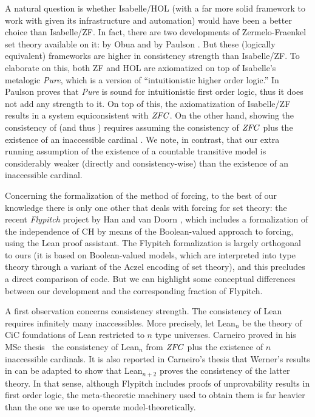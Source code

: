 A natural question is whether Isabelle/HOL (with a far more solid
framework to work with given its infrastructure and automation) would
have been a better choice than Isabelle/ZF. In fact,
there are two developments of Zermelo-Fraenkel set theory available on
it:  by Obua \cite{DBLP:conf/ictac/Obua06} and
 by Paulson
\cite{ZFC_in_HOL-AFP}. But these (logically equivalent) frameworks are
higher in consistency strength than Isabelle/ZF. To elaborate on this,
both ZF and HOL are axiomatized on top of Isabelle's metalogic
\emph{Pure}, which is a version of ``intuitionistic higher order
logic.'' In  \cite{Paulson1989} Paulson proves that \emph{Pure}
is sound for intuitionistic first order logic, thus it does not add
any strength to it. On top of this, the axiomatization of Isabelle/ZF
results in a system equiconsistent with $\mathit{ZFC}$. On the other hand,
showing the consistency of  (and thus
) requires
assuming the consistency of $\mathit{ZFC}$ plus the existence of an
inaccessible cardinal \cite[Sect.~3]{DBLP:conf/ictac/Obua06}. We note,
in contrast, that our extra running assumption of the existence of a
countable transitive model is considerably weaker (directly and
consistency-wise) than the existence of an inaccessible cardinal.

Concerning the formalization of the method of forcing, to the best of
our knowledge there is only one other that deals with forcing for
set theory: the recent \emph{Flypitch} project by Han and van Doorn
\cite{han_et_al:LIPIcs:2019:11074,DBLP:conf/cpp/HanD20}, which
includes a formalization of the independence of CH by means of the
Boolean-valued approach to forcing, using the Lean proof
assistant. The Flypitch formalization is largely orthogonal to ours
(it is based on Boolean-valued models, which are interpreted into
type theory through a variant of the Aczel encoding of set theory),
and this precludes a direct comparison of code. But we can highlight
some conceptual differences between our development and the
corresponding fraction of Flypitch.


A first observation concerns consistency strength. The consistency of
Lean requires infinitely many inaccessibles. More precisely, let
Lean$_n$ be the theory of CiC foundations of Lean restricted to $n$
type universes.  Carneiro proved in his MSc thesis~\cite{carneiro-ms-thesis} the consistency of Lean$_n$ from $\mathit{ZFC}$ plus
the existence of $n$ inaccessible cardinals. It is also reported in
Carneiro's thesis that Werner's results in
\cite{10.5555/645869.668660} can be adapted to show that Lean$_{n+2}$
proves the consistency of the latter theory.  In that sense, although
Flypitch includes proofs of unprovability results in first order
logic, the meta-theoretic machinery used to obtain them is far heavier
than the one we use to operate model-theoretically.

